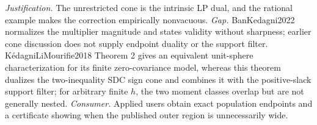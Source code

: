 \documentclass{article}
\begin{document}
\par\smallskip\noindent \textit{Justification.} The unrestricted cone is the intrinsic LP dual, and the rational example makes the correction empirically nonvacuous. \textit{Gap.} BanKedagni2022 normalizes the multiplier magnitude and states validity without sharpness; earlier cone discussion does not supply endpoint duality or the support filter. KédagniLiMourifie2018 Theorem 2 gives an equivalent unit-sphere characterization for its finite zero-covariance model, whereas this theorem dualizes the two-inequality SDC sign cone and combines it with the positive-slack support filter; for arbitrary finite \(h\), the two moment classes overlap but are not generally nested. \textit{Consumer.} Applied users obtain exact population endpoints and a certificate showing when the published outer region is unnecessarily wide.
\end{document}
